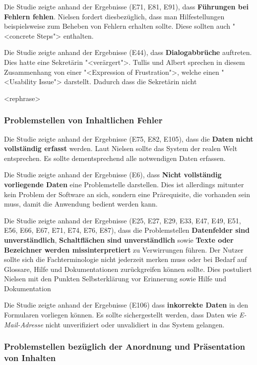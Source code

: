 Die Studie zeigte anhand der Ergebnisse (E71, E81, E91), dass \textbf{Führungen bei Fehlern fehlen}. Nielsen fordert diesbezüglich, dass man Hilfestellungen beispielsweise zum Beheben von Fehlern erhalten sollte. Diese sollten auch "<concrete Steps"> enthalten. \cite{Nielsen10}

Die Studie zeigte anhand der Ergebnisse (E44), dass \textbf{Dialogabbrüche} auftreten. Dies hatte eine Sekretärin "<verärgert">. Tullis und Albert sprechen in diesem Zusammenhang von einer "<Expression of Frustration">, welche einen "<Usability Issue"> darstellt.\cite{TullisAlbert} Dadurch dass die Sekretärin nicht 

<rephrase> 
\subsubsection{Problemstellen von Inhaltlichen Fehler}
Die Studie zeigte anhand der Ergebnisse (E75, E82, E105), dass die \textbf{Daten nicht vollständig erfasst} werden. Laut Nielsen sollte das System der realen Welt entsprechen.\cite{Nielsen10} Es sollte dementsprechend alle notwendigen Daten erfassen.

Die Studie zeigte anhand der Ergebnisse (E6), dass \textbf{Nicht vollständig vorliegende Daten} eine Problemstelle darstellen. Dies ist allerdings mitunter kein Problem der Software an sich, sondern eine Prärequisite, die vorhanden sein muss, damit die Anwendung bedient werden kann.

Die Studie zeigte anhand der Ergebnisse (E25, E27, E29, E33, E47, E49, E51, E56, E66, E67, E71, E74, E76, E87), dass die Problemstellen \textbf{Datenfelder sind unverständlich}, \textbf{Schaltflächen sind unverständlich} sowie \textbf{Texte oder Bezeichner werden missinterpretiert} zu Verwirrungen führen. Der Nutzer sollte sich die Fachterminologie nicht jederzeit merken muss oder bei Bedarf auf Glossare, Hilfe und Dokumentationen zurückgreifen können sollte. Dies postuliert Nielsen mit den Punkten \glqq Selbsterklärung vor Erinnerung\grqq{} sowie \glqq Hilfe und Dokumentation\grqq{} \cite{Nielsen10}

Die Studie zeigte anhand der Ergebnisse (E106) dass \textbf{inkorrekte Daten} in den Formularen vorliegen können. Es sollte sichergestellt werden, dass Daten wie \textit{E-Mail-Adresse} nicht unverifiziert oder unvalidiert in das System gelangen.

\subsubsection{Problemstellen bezüglich der Anordnung und Präsentation von Inhalten}


